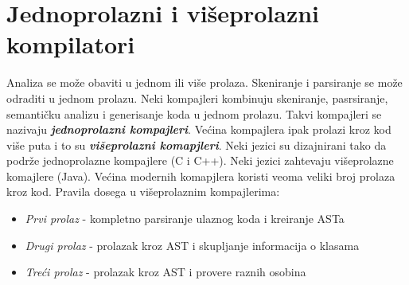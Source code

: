 \documentclass[10pt]{extarticle}
\begin{document}
\section{Jednoprolazni i višeprolazni kompilatori}
\noindent
Analiza se može obaviti u jednom ili više prolaza. Skeniranje i parsiranje se može odraditi u jednom prolazu. Neki kompajleri kombinuju skeniranje, pasrsiranje, semantičku analizu i generisanje koda u jednom prolazu. Takvi kompajleri se nazivaju \textit{\textbf{jednoprolazni kompajleri}}. Većina kompajlera ipak prolazi kroz kod više puta i to su \textit{\textbf{višeprolazni komapjleri}}. Neki jezici su dizajnirani tako da podrže jednoprolazne kompajlere (C i C++). Neki jezici zahtevaju višeprolazne komajlere (Java). Većina modernih komapjlera koristi veoma veliki broj prolaza kroz kod. Pravila dosega u višeprolaznim kompajlerima:
\begin{itemize}
    \item \textit{Prvi prolaz} - kompletno parsiranje ulaznog koda i kreiranje ASTa
    \item \textit{Drugi prolaz} - prolazak kroz AST i skupljanje informacija o klasama
    \item \textit{Treći prolaz} - prolazak kroz AST i provere raznih osobina
\end{itemize}
\end{document}
